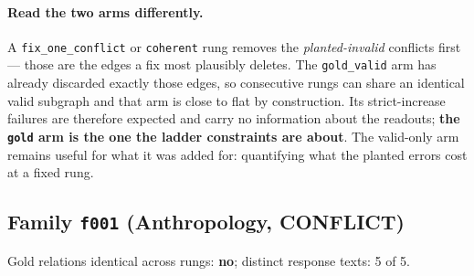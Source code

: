 \documentclass[11pt]{article}
\begin{document}
\paragraph{Read the two arms differently.} A \texttt{fix\_one\_conflict} or \texttt{coherent} rung removes the \emph{planted-invalid} conflicts first --- those are the edges a fix most plausibly deletes. The \texttt{gold\_valid} arm has already discarded exactly those edges, so consecutive rungs can share an identical valid subgraph and that arm is close to flat by construction. Its strict-increase failures are therefore expected and carry no information about the readouts; \textbf{the \texttt{gold} arm is the one the ladder constraints are about}. The valid-only arm remains useful for what it was added for: quantifying what the planted errors cost at a fixed rung.

\subsection*{Family \texttt{f001} (Anthropology, CONFLICT)}

Gold relations identical across rungs: \textbf{no}; distinct response texts: 5 of 5.
\end{document}
